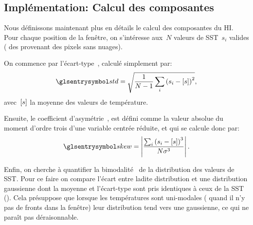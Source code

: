 \subsection{Implémentation: Calcul des composantes}
\label{sec:calcul-composantes}

Nous définissons maintenant plus en détails le calcul des composantes du HI.
Pour chaque position de la fenêtre, on s'intéresse aux~\(N\) valeurs de SST~\(s_{i}\) valides ( des provenant des pixels sans nuages).

On commence par l'écart-type~, calculé simplement par:
\begin{equation}
  \am{std} = \sqrt{\frac{1}{N-1} \sum_i \paren{s_i - \moy{s}}^2},
\end{equation}
avec~\(\left[s\right]\) la moyenne des valeurs de température.

Ensuite, le coefficient d'asymétrie~, est défini comme la valeur absolue du moment d'ordre trois d'une variable centrée réduite, et qui se calcule donc par:
\begin{equation}
  \am{skew} = \abs{\frac{\sum_i \paren{s_i - \moy{s}}^3} {N \sigma^3}}.
\end{equation}

Enfin, on cherche à quantifier la bimodalité~ de la distribution des valeurs de SST.
Pour ce faire on compare l'écart entre ladite distribution et une distribution gaussienne dont la moyenne et l'écart-type sont pris identiques à ceux de la SST ().
Cela présuppose que lorsque les températures sont uni-modales ( quand il n'y pas de fronts dans la fenêtre) leur distribution tend vers une gaussienne, ce qui ne paraît pas déraisonnable.

\begin{figure}
  \centering
  \label{fig:bimodality}
\end{figure}


